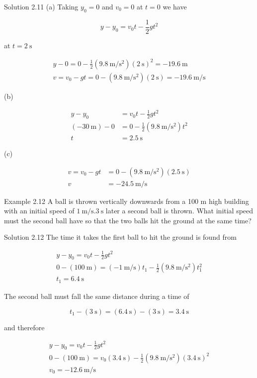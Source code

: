 \documentclass[10pt]{article}
\numberwithin{equation}{section}
\begin{document}
Solution 2.11 (a) Taking $y_{0}=0$ and $v_{0}=0$ at $t=0$ we have

$$
y-y_{0}=v_{0} t-\frac{1}{2} g t^{2}
$$

at $t=2 \mathrm{~s}$

$$
\begin{gathered}
y-0=0-\frac{1}{2}\left(9.8 \mathrm{~m} / \mathrm{s}^{2}\right)(2 \mathrm{~s})^{2}=-19.6 \mathrm{~m} \\
v=v_{0}-g t=0-\left(9.8 \mathrm{~m} / \mathrm{s}^{2}\right)(2 \mathrm{~s})=-19.6 \mathrm{~m} / \mathrm{s}
\end{gathered}
$$

(b)

$$
\begin{aligned}
y-y_{0} & =v_{0} t-\frac{1}{2} g t^{2} \\
(-30 \mathrm{~m})-0 & =0-\frac{1}{2}\left(9.8 \mathrm{~m} / \mathrm{s}^{2}\right) t^{2} \\
t & =2.5 \mathrm{~s}
\end{aligned}
$$

(c)

$$
\begin{aligned}
v=v_{0}-g t & =0-\left(9.8 \mathrm{~m} / \mathrm{s}^{2}\right)(2.5 \mathrm{~s}) \\
v & =-24.5 \mathrm{~m} / \mathrm{s}
\end{aligned}
$$

Example 2.12 A ball is thrown vertically downwards from a 100 m high building with an initial speed of $1 \mathrm{~m} / \mathrm{s} .3 \mathrm{~s}$ later a second ball is thrown. What initial speed must the second ball have so that the two balls hit the ground at the same time?

Solution 2.12 The time it takes the first ball to hit the ground is found from

$$
\begin{gathered}
y-y_{0}=v_{0} t-\frac{1}{2} g t^{2} \\
0-(100 \mathrm{~m})=(-1 \mathrm{~m} / \mathrm{s}) t_{1}-\frac{1}{2}\left(9.8 \mathrm{~m} / \mathrm{s}^{2}\right) t_{1}^{2} \\
t_{1}=6.4 \mathrm{~s}
\end{gathered}
$$

The second ball must fall the same distance during a time of

$$
t_{1}-(3 \mathrm{~s})=(6.4 \mathrm{~s})-(3 \mathrm{~s})=3.4 \mathrm{~s}
$$

and therefore

$$
\begin{gathered}
y-y_{0}=v_{0} t-\frac{1}{2} g t^{2} \\
0-(100 \mathrm{~m})=v_{0}(3.4 \mathrm{~s})-\frac{1}{2}\left(9.8 \mathrm{~m} / \mathrm{s}^{2}\right)(3.4 \mathrm{~s})^{2} \\
v_{0}=-12.6 \mathrm{~m} / \mathrm{s}
\end{gathered}
$$
\end{document}
